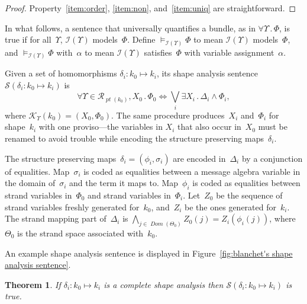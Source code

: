 \documentclass[titlepage,12pt]{article}
\newtheorem{thm}{Theorem}
\newcommand{\fn}[1]{\ensuremath{\operatorname{\mathit{#1}}}}
\newcommand{\typ}{\mathbin:}
\newcommand{\sdom}{\fn{Dom}}
\newcommand{\all}[1]{\forall#1\mathpunct.}
\newcommand{\some}[1]{\exists#1\mathpunct.}
\newcommand{\run}{\mathcal{R}}
\newcommand{\pt}{\fn{pt}}
\newcommand{\form}{\mathcal{K}}
\newcommand{\sent}{\mathcal{S}}
\newcommand{\interp}{\mathcal{I}}
\begin{document}
\begin{proof}
Property~\ref{item:order}, \ref{item:non}, and~\ref{item:uniq} are
straightforward.
\end{proof}

In what follows, a sentence that universally quantifies a bundle, as
in $\all{\Upsilon}\Phi$, is true if for all~$\Upsilon$,
$\interp(\Upsilon)$ models~$\Phi$. Define
$\models_{\interp(\Upsilon)}\Phi$ to mean $\interp(\Upsilon)$
models~$\Phi$, and $\models_{\interp(\Upsilon)}\Phi$ with~$\alpha$ to
mean $\interp(\Upsilon)$ satisfies~$\Phi$ with variable
assignment~$\alpha$.

Given a set of homomorphisms $\delta_i\typ k_0\mapsto k_i$, its shape
analysis sentence $\sent(\delta_i\typ k_0\mapsto k_i)$ is
\begin{equation}\label{eqn:shape sentence}
\all{\Upsilon\in\run_{\pt(k_0)},X_0}\Phi_0 \Longleftrightarrow
\bigvee_i\some{X_i}\Delta_i\wedge\Phi_i,
\end{equation}
where $\form_\Upsilon(k_0)=(X_0,\Phi_0)$.  The same procedure
produces~$X_i$ and~$\Phi_i$ for shape~$k_i$ with one proviso---the
variables in $X_i$ that also occur in~$X_0$ must be renamed to avoid
trouble while encoding the structure
preserving maps~$\delta_i$.

The structure preserving maps~$\delta_i=(\phi_i,\sigma_i)$ are encoded
in~$\Delta_i$ by a conjunction of equalities.  Map~$\sigma_i$ is coded
as equalities between a message algebra variable in the domain
of~$\sigma_i$ and the term it maps to.  Map~$\phi_i$ is coded as
equalities between strand variables in~$\Phi_0$ and strand variables
in~$\Phi_i$.  Let~$Z_0$ be the sequence of strand variables freshly
generated for~$k_0$, and~$Z_i$ be the ones generated for~$k_i$.  The
strand mapping part of~$\Delta_i$ is
$\bigwedge_{j\in\sdom(\Theta_0)}Z_0(j)=Z_i(\phi_i(j))$,
where~$\Theta_0$ is the strand space associated with~$k_0$.

An example shape analysis sentence is displayed in
Figure~\ref{fig:blanchet's shape analysis sentence}.

\begin{thm}\label{thm:sas}
If $\delta_i\typ k_0\mapsto k_i$ is a complete shape analysis then
$\sent(\delta_i\typ k_0\mapsto k_i)$ is true.
\end{thm}
\end{document}
